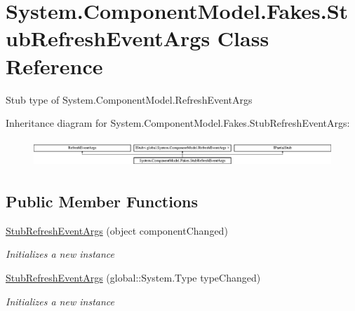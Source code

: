\hypertarget{class_system_1_1_component_model_1_1_fakes_1_1_stub_refresh_event_args}{\section{System.\-Component\-Model.\-Fakes.\-Stub\-Refresh\-Event\-Args Class Reference}
\label{class_system_1_1_component_model_1_1_fakes_1_1_stub_refresh_event_args}
}


Stub type of System.\-Component\-Model.\-Refresh\-Event\-Args 


Inheritance diagram for System.\-Component\-Model.\-Fakes.\-Stub\-Refresh\-Event\-Args\-:\begin{figure}[H]
\begin{center}
\leavevmode
\includegraphics[height=1.039926cm]{class_system_1_1_component_model_1_1_fakes_1_1_stub_refresh_event_args}
\end{center}
\end{figure}
\subsection*{Public Member Functions}
\begin{DoxyCompactItemize}
\item 
\hyperlink{class_system_1_1_component_model_1_1_fakes_1_1_stub_refresh_event_args_adccb80a3dfdcb86b2fef14366d6e10fa}{Stub\-Refresh\-Event\-Args} (object component\-Changed)
\begin{DoxyCompactList}\small\item\em Initializes a new instance\end{DoxyCompactList}\item 
\hyperlink{class_system_1_1_component_model_1_1_fakes_1_1_stub_refresh_event_args_a6ef67be2878a201b7ea7a14759774023}{Stub\-Refresh\-Event\-Args} (global\-::\-System.\-Type type\-Changed)
\begin{DoxyCompactList}\small\item\em Initializes a new instance\end{DoxyCompactList}\end{DoxyCompactItemize}
